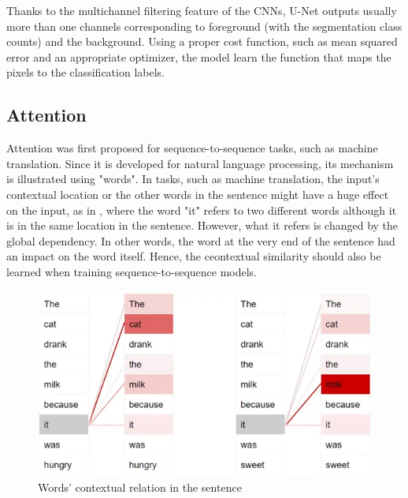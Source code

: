 \documentclass{IEEEtran}
\begin{document}
Thanks to the multichannel filtering feature of the CNNs, U-Net outputs usually more than one channels corresponding to foreground (with the segmentation class counts)
and the background. Using a proper cost function, such as mean squared error and an appropriate optimizer, the model learn the function that maps the pixels to the classification labels.  

\subsection{Attention}

Attention was first proposed for sequence-to-sequence tasks, such as machine translation. Since it is developed for natural language processing, its mechanism is illustrated using "words". In tasks, such as machine translation, the input's contextual location or the other words in the sentence might have a huge effect on the input, as in , where the word "it" refers to two different words although it is in the same location in the sentence. However, what it refers is changed by the global dependency. In other words, the word at the very end of the sentence had an impact on the word itself. Hence, the ceontextual similarity should also be learned when training sequence-to-sequence models. 
\begin{figure}[h]
\centering
\includegraphics[width=\textwidth]{img/attention.png}
\caption{Words' contextual relation in the sentence \cite{doshi_2021}}\label{fig:attention}
\end{figure}
\end{document}

